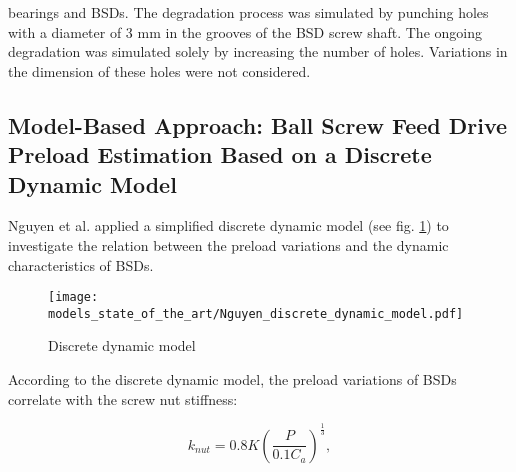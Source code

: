bearings and BSDs. The degradation process was simulated by punching holes with a diameter of 3 mm in the grooves of the BSD screw shaft. The ongoing degradation was simulated solely by increasing the number of holes. Variations in the dimension of these holes were not considered.

\subsection{Model-Based Approach: Ball Screw Feed Drive Preload Estimation Based on a Discrete Dynamic Model}
Nguyen et al. \cite{NGUYEN2019} applied a simplified discrete dynamic model (see fig. \ref{fig:Nguyen_discrete_dynamic_model}) to investigate the relation between the preload variations and the dynamic characteristics of BSDs.

\begin{figure}[H]
  \centering
  \texttt{[image: models\_state\_of\_the\_art/Nguyen\_discrete\_dynamic\_model.pdf]}
  \caption{Discrete dynamic model \cite{NGUYEN2019}}
  \label{fig:Nguyen_discrete_dynamic_model}
\end{figure}

According to the discrete dynamic model, the preload variations of BSDs correlate with the screw nut stiffness:

\begin{equation}
    k_{nut}=0.8K(\frac{P}{0.1C_{a}})^{\frac{1}{3}},
\end{equation}

